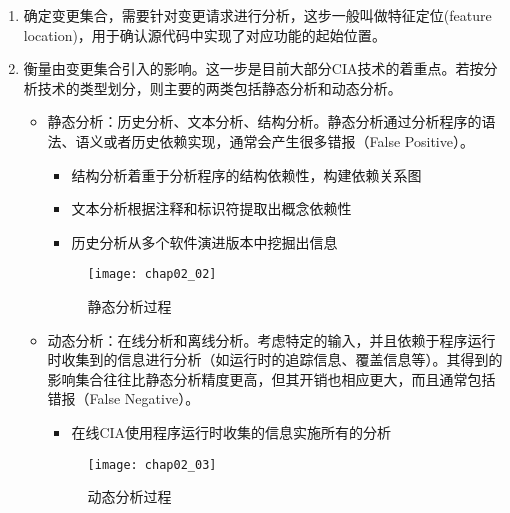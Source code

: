 \begin{enumerate}
	\item 确定变更集合，需要针对变更请求进行分析，这步一般叫做特征定位(feature location)，用于确认源代码中实现了对应功能的起始位置\cite{biggerstaff1993concept}。
	\item 衡量由变更集合引入的影响。这一步是目前大部分CIA技术的着重点。若按分析技术的类型划分，则主要的两类包括静态分析和动态分析。
	\begin{itemize}
	
	\item 静态分析：历史分析、文本分析、结构分析\cite{sun2012comparative,kagdi2007survey}。静态分析通过分析程序的语法、语义或者历史依赖实现，通常会产生很多错报（False Positive）。
		\begin{itemize}
		\item 结构分析着重于分析程序的结构依赖性，构建依赖关系图
		\item 文本分析根据注释和标识符提取出概念依赖性
		\item 历史分析从多个软件演进版本中挖掘出信息
		\end{itemize}
		\begin{figure}[H]
			\centering
			\texttt{[image: chap02\_02]}
			\caption {静态分析过程}
		\end{figure}
	
	\item 动态分析：在线分析和离线分析。考虑特定的输入，并且依赖于程序运行时收集到的信息进行分析（如运行时的追踪信息、覆盖信息等）\cite{law2003whole}。其得到的影响集合往往比静态分析精度更高，但其开销也相应更大，而且通常包括错报（False Negative）。
		\begin{itemize}
		\item 在线CIA使用程序运行时收集的信息实施所有的分析
		\end{itemize}
		
		\begin{figure}[H]
			\centering
			\texttt{[image: chap02\_03]}
			\caption {动态分析过程}
		\end{figure}	

		
	\end{itemize}
\end{enumerate}



